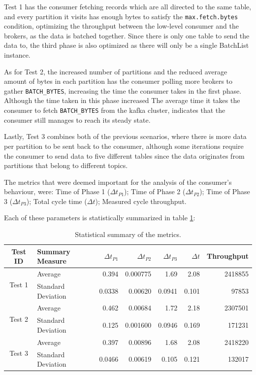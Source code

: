 Test 1 has the consumer fetching records which are all directed to the same
table, and every partition it visits has enough bytes to satisfy the
\lstinline{max.fetch.bytes} condition, optimizing the throughput between the
low-level consumer and the brokers, as the data is batched together. Since there
is only one table to send the data to, the third phase is also optimized as
there will only be a single BatchList instance.

As for Test 2, the increased number of partitions and the reduced average amount
of bytes in each partition has the consumer polling more brokers to gather
\lstinline{BATCH_BYTES}, increasing the time the consumer takes in the first
phase. Although the time taken in this phase increased The average time it takes
the consumer to fetch \lstinline{BATCH_BYTES} from the kafka cluster, indicates
that the consumer still manages to reach its steady state.

Lastly, Test 3 combines both of the previous scenarios, where there is more data
per partition to be sent back to the consumer, although some iterations require
the consumer to send data to five different tables since the data originates from
partitions that belong to different topics.

The metrics that were deemed important for the analysis of the consumer's
behaviour, were: Time of Phase 1 ($\Delta t_{P1}$); Time of Phase 2 ($\Delta
t_{P2}$); Time of Phase 3 ($\Delta t_{P3}$); Total cycle time ($\Delta t$);
Measured cycle throughput.

Each of these parameters is statistically summarized in table
\ref{tab:consumer_results}:
\begin{table}[H] 
\centering 
\caption{Statistical summary of the metrics.}
\label{tab:consumer_results}
    \begin{tabular}{ |c|l|r|r|r|r|r| } 
        \hline 
        \textbf{Test ID} & \textbf{Summary Measure} & \textbf{$\Delta t_{P1}$} &
            \textbf{$\Delta t_{P2}$} & \textbf{$\Delta t_{P3}$} & \textbf{$\Delta t$} & \textbf{Throughput} \\ 
            \hline
            \multirow{2}{*}{Test 1} 
            & Average & 0.394  & 0.000775 & 1.69 & 2.08 & 2418855 \\ 
            & Standard Deviation & 0.0338 & 0.00620  & 0.0941 & 0.101 & 97853 \\ 
            \hline 
            \multirow{2}{*}{Test 2} 
            & Average & 0.462 & 0.00684 & 1.72 & 2.18 & 2307501 \\ 
            & Standard Deviation & 0.125 & 0.001600  & 0.0946 & 0.169 & 171231 \\ 
            \hline \multirow{2}{*}{Test 3} 
            & Average & 0.397  & 0.00896 & 1.68 & 2.08 & 2418220 \\ 
            &  Standard Deviation & 0.0466 & 0.00619 & 0.105 & 0.121 & 132017 \\ 
    \hline 
    \end{tabular} 
\end{table}

